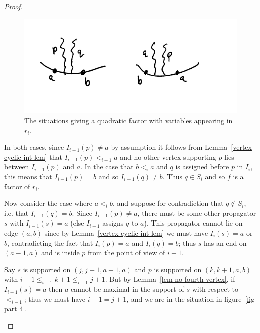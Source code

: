 \documentclass[11pt]{article}
\theoremstyle{remark}
\theoremstyle{definition}
\begin{document}
\begin{proof}
\begin{enumerate}
\begin{figure}
  \includegraphics{quadratic}
  \caption{The situations giving a quadratic factor with variables appearing in $r_i$.}\label{fig quadratic}
\end{figure}

In both cases, since $I_{i-1}(p)\neq a$ by assumption it follows from Lemma~\ref{vertex cyclic int lem} that $I_{i-1}(p) <_{i-1} a$ and no other vertex supporting $p$ lies between $I_{i-1}(p)$ and $a$. In the case that $b<_i a$ and $q$ is assigned before $p$ in $I_i$, this means that $I_{i-1}(p)=b$ and so $I_{i-1}(q)\neq b$.  Thus $q\in S_i$ and so $f$ is a factor of $r_i$.

Now consider the case where $a<_i b$, and suppose for contradiction that $q \not\in S_i$, i.e. that $I_{i-1}(q) = b$. Since $I_{i-1}(p) \neq a$, there must be some other propagator $s$ with $I_{i-1}(s) = a$ (else $I_{i-1}$ assigns $q$ to $a$). This propagator cannot lie on edge $(a,b)$ since by Lemma~\ref{vertex cyclic int lem} we must have $I_i(s) = a$ or $b$, contradicting the fact that $I_i(p) = a$ and $I_i(q) = b$; thus $s$ has an end on $(a-1,a)$ and is inside $p$ from the point of view of $i-1$.

Say $s$ is supported on $(j, j+1, a-1, a)$ and $p$ is supported on $(k, k+1, a, b)$ with $i-1 \leq_{i-1} k+1 \leq_{i-1} j+1$. But by Lemma~\ref{lem no fourth vertex}, if $I_{i-1}(s) = a$ then $a$ cannot be maximal in the support of $s$ with respect to $<_{i-1}$; thus we must have $i-1 = j+1$, and we are in the situation in figure~\ref{fig part 4}.


\end{enumerate}
\end{proof}
\end{document}
